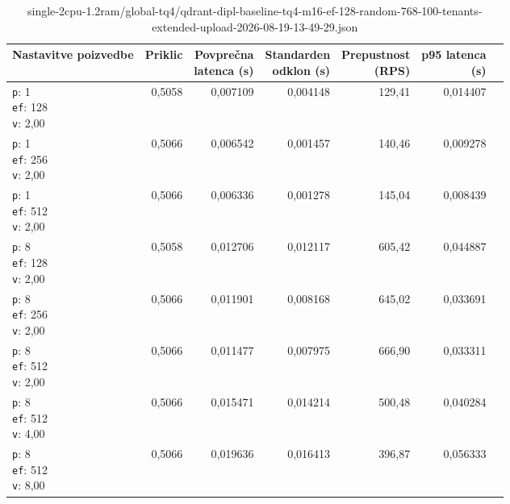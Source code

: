 \begin{table}[htbp]
  \centering
\small
  \caption{single-2cpu-1.2ram/global-tq4/qdrant-dipl-baseline-tq4-m16-ef-128-random-768-100-tenants-extended-upload-2026-08-19-13-49-29.json}
  \label{tab:single-2cpu-1.2ram:global-tq4:qdrant-dipl-baseline-tq4-m16-ef-128-random-768-100-tenants-extended-upload-2026-08-19-13-49-29.json}
  \begin{tabularx}{\textwidth}{Xrrrrrr}
    \toprule
    Nastavitve poizvedbe & Priklic & \makecell{Povprečna\\latenca (s)} & \makecell{Standarden\\odklon (s)} & \makecell{Prepustnost\\(RPS)} & \makecell{p95 latenca\\(s)}  \\
    \midrule
    \makecell{\texttt{p}: 1\\\texttt{ef}: 128\\\texttt{v}: 2,00} & 0,5058 & 0,007109 & 0,004148 & 129,41 & 0,014407 \\
    \makecell{\texttt{p}: 1\\\texttt{ef}: 256\\\texttt{v}: 2,00} & 0,5066 & 0,006542 & 0,001457 & 140,46 & 0,009278 \\
    \makecell{\texttt{p}: 1\\\texttt{ef}: 512\\\texttt{v}: 2,00} & 0,5066 & 0,006336 & 0,001278 & 145,04 & 0,008439 \\
    \makecell{\texttt{p}: 8\\\texttt{ef}: 128\\\texttt{v}: 2,00} & 0,5058 & 0,012706 & 0,012117 & 605,42 & 0,044887 \\
    \makecell{\texttt{p}: 8\\\texttt{ef}: 256\\\texttt{v}: 2,00} & 0,5066 & 0,011901 & 0,008168 & 645,02 & 0,033691 \\
    \makecell{\texttt{p}: 8\\\texttt{ef}: 512\\\texttt{v}: 2,00} & 0,5066 & 0,011477 & 0,007975 & 666,90 & 0,033311 \\
    \makecell{\texttt{p}: 8\\\texttt{ef}: 512\\\texttt{v}: 4,00} & 0,5066 & 0,015471 & 0,014214 & 500,48 & 0,040284 \\
    \makecell{\texttt{p}: 8\\\texttt{ef}: 512\\\texttt{v}: 8,00} & 0,5066 & 0,019636 & 0,016413 & 396,87 & 0,056333 \\

\end{tabularx}
\end{table}
